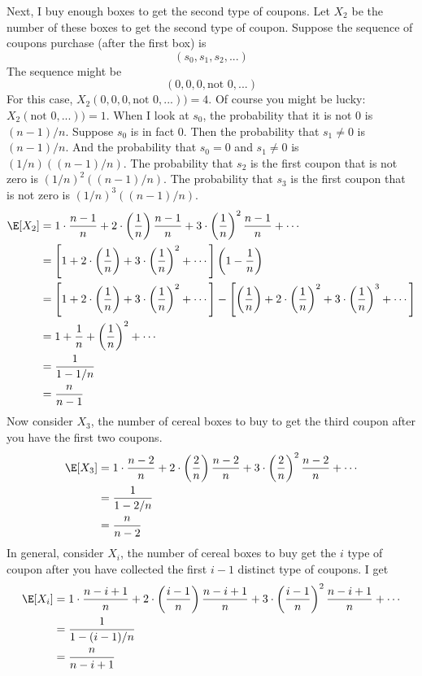 Next, I buy enough boxes to get the second type of
coupons.
Let $X_2$ be the number of these boxes to get the second type of coupon.
Suppose the sequence of coupons purchase (after the first box) is
\[
  (s_0, s_1, s_2, ...)
\]
The sequence might be
\[
  (0, 0, 0, \text{not 0}, ...)
\]
For this case, $X_2(0, 0, 0, \text{not 0}, ...)) = 4$.
Of course you might be lucky:
$X_2(\text{not 0}, ...)) = 1$.
When I look at $s_0$, the probability that
it is not 0 is $(n - 1)/n$.
Suppose $s_0$ is in fact 0.
Then the probability that
$s_1 \neq 0$ is $(n - 1)/n$.
And the probability that $s_0 = 0$ and
$s_1 \neq 0$ is $(1/n)((n - 1)/n)$.
The probability that $s_2$ is the first coupon
that is not zero is $(1/n)^2((n - 1)/n)$.
The probability that $s_3$ is the first coupon
that is not zero is $(1/n)^3((n - 1)/n)$.
\begin{align*}
  \E[X_2]
  &= 1 \cdot \frac{n-1}{n} + 2 \cdot \left(\frac{1}{n}\right) \frac{n - 1}{n} + 3 \cdot \left(\frac{1}{n}\right)^2\frac{n - 1}{n} + \cdots 
  \\
  &= \left[ 1 + 2 \cdot \left(\frac{1}{n}\right) + 3 \cdot \left(\frac{1}{n}\right)^2 + \cdots \right]
    \left( 1 - \frac{1}{n} \right)
  \\
  &= \left[ 1 + 2 \cdot \left(\frac{1}{n}\right) + 3 \cdot \left(\frac{1}{n}\right)^2 + \cdots \right]
    - \left[\left(\frac{1}{n}\right) + 2 \cdot \left(\frac{1}{n}\right)^2 + 3 \cdot \left(\frac{1}{n}\right)^3 + \cdots \right]
  \\
  &= 1 + \frac{1}{n} + \left(\frac{1}{n}\right)^2 + \cdots
  \\
  &= \frac{1}{1 - 1/n}
  \\
  &= \frac{n}{n - 1}
\end{align*}
Now consider $X_3$, the number of cereal boxes to buy to get the third coupon after you have the first two coupons.
\begin{align*}
  \E[X_3]
  &= 1 \cdot \frac{n-2}{n} + 2 \cdot \left(\frac{2}{n}\right) \frac{n - 2}{n} + 3 \cdot \left(\frac{2}{n}\right)^2\frac{n - 2}{n} + \cdots 
  \\
  &= \frac{1}{1 - 2/n}
    \\
  &= \frac{n}{n - 2}
\end{align*}
In general, consider $X_i$, the number of cereal boxes to buy get the $i$ type of coupon after you have
collected the first $i - 1$ distinct type of coupons.
I get
\begin{align*}
  \E[X_i]
  &= 1 \cdot \frac{n- i + 1}{n}
    + 2 \cdot \left(\frac{i - 1}{n}\right) \frac{n - i + 1}{n}
    + 3 \cdot \left(\frac{i - 1}{n}\right)^2\frac{n - i + 1}{n} + \cdots 
  \\
  &= \frac{1}{1 - (i - 1)/n}
    \\
  &= \frac{n}{n - i + 1}
\end{align*}
